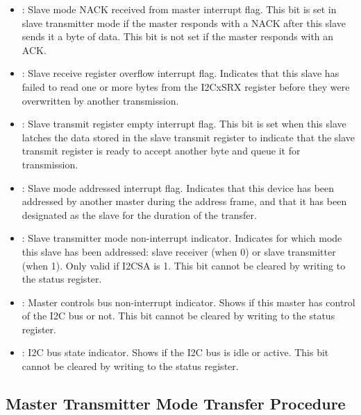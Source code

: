 \begin{itemize}
	\item {}: Slave mode NACK received from master interrupt flag. This bit is set in slave transmitter mode if the master responds with a NACK after this slave sends it a byte of data. This bit is not set if the master responds with an ACK.
	\item {}: Slave receive register overflow interrupt flag. Indicates that this slave has failed to read one or more bytes from the I2CxSRX register before they were overwritten by another transmission.
	\item {}: Slave transmit register empty interrupt flag. This bit is set when this slave latches the data stored in the slave transmit register to indicate that the slave transmit register is ready to accept another byte and queue it for transmission.
	\item {}: Slave mode addressed interrupt flag. Indicates that this device has been addressed by another master during the address frame, and that it has been designated as the slave for the duration of the transfer.
	\item {}: Slave transmitter mode non-interrupt indicator. Indicates for which mode this slave has been addressed: slave receiver (when 0) or slave transmitter (when 1). Only valid if I2CSA is 1. This bit cannot be cleared by writing to the status register.
	\item {}: Master controls bus non-interrupt indicator. Shows if this master has control of the I2C bus or not. This bit cannot be cleared by writing to the status register.
	\item {}: I2C bus state indicator. Shows if the I2C bus is idle or active. This bit cannot be cleared by writing to the status register.
\end{itemize}



\subsection{Master Transmitter Mode Transfer Procedure}

